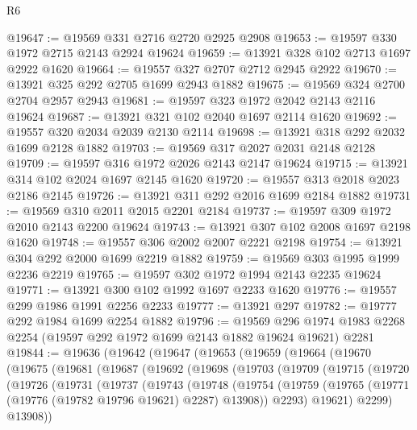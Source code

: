 \begin{lexlean}{R6}
\begin{coremodule}
@19647 := @19569 @331 @2716 @2720 @2925 @2908
@19653 := @19597 @330 @1972 @2715 @2143 @2924 @19624
@19659 := @13921 @328 @102 @2713 @1697 @2922 @1620
@19664 := @19557 @327 @2707 @2712 @2945 @2922
@19670 := @13921 @325 @292 @2705 @1699 @2943 @1882
@19675 := @19569 @324 @2700 @2704 @2957 @2943
@19681 := @19597 @323 @1972 @2042 @2143 @2116 @19624
@19687 := @13921 @321 @102 @2040 @1697 @2114 @1620
@19692 := @19557 @320 @2034 @2039 @2130 @2114
@19698 := @13921 @318 @292 @2032 @1699 @2128 @1882
@19703 := @19569 @317 @2027 @2031 @2148 @2128
@19709 := @19597 @316 @1972 @2026 @2143 @2147 @19624
@19715 := @13921 @314 @102 @2024 @1697 @2145 @1620
@19720 := @19557 @313 @2018 @2023 @2186 @2145
@19726 := @13921 @311 @292 @2016 @1699 @2184 @1882
@19731 := @19569 @310 @2011 @2015 @2201 @2184
@19737 := @19597 @309 @1972 @2010 @2143 @2200 @19624
@19743 := @13921 @307 @102 @2008 @1697 @2198 @1620
@19748 := @19557 @306 @2002 @2007 @2221 @2198
@19754 := @13921 @304 @292 @2000 @1699 @2219 @1882
@19759 := @19569 @303 @1995 @1999 @2236 @2219
@19765 := @19597 @302 @1972 @1994 @2143 @2235 @19624
@19771 := @13921 @300 @102 @1992 @1697 @2233 @1620
@19776 := @19557 @299 @1986 @1991 @2256 @2233
@19777 := @13921 @297
@19782 := @19777 @292 @1984 @1699 @2254 @1882
@19796 := @19569
    @296
    @1974
    @1983
    @2268
    @2254
    (@19597 @292 @1972 @1699 @2143 @1882 @19624 @19621)
    @2281
@19844 := @19636
    (@19642
      (@19647
        (@19653
          (@19659
            (@19664
              (@19670
                (@19675
                  (@19681
                    (@19687
                      (@19692
                        (@19698
                          (@19703
                            (@19709
                              (@19715
                                (@19720
                                  (@19726
                                    (@19731
                                      (@19737
                                        (@19743
                                          (@19748
                                            (@19754
                                              (@19759
                                                (@19765
                                                  (@19771
                                                    (@19776 (@19782 @19796 @19621) @2287)
                                                    @13908))
                                                @2293)
                                              @19621)
                                            @2299)
                                          @13908))

\end{coremodule}
\end{lexlean}
